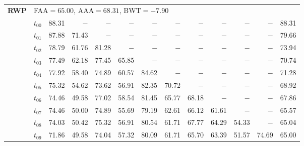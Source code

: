 \begin{table}[ht]
\begin{tabular}{@{}l l r r r r r r r r r r r@{}}
\midrule
\multirow{11}{*}{\textbf{RWP}} & \multicolumn{12}{l}{\quad\small FAA$=65.00$,\; AAA$=68.31$,\; BWT$=-7.90$} \\
 & $t_{00}$ & 88.31 & $-$ & $-$ & $-$ & $-$ & $-$ & $-$ & $-$ & $-$ & $-$ & 88.31 \\
 & $t_{01}$ & 87.88 & 71.43 & $-$ & $-$ & $-$ & $-$ & $-$ & $-$ & $-$ & $-$ & 79.66 \\
 & $t_{02}$ & 78.79 & 61.76 & 81.28 & $-$ & $-$ & $-$ & $-$ & $-$ & $-$ & $-$ & 73.94 \\
 & $t_{03}$ & 77.49 & 62.18 & 77.45 & 65.85 & $-$ & $-$ & $-$ & $-$ & $-$ & $-$ & 70.74 \\
 & $t_{04}$ & 77.92 & 58.40 & 74.89 & 60.57 & 84.62 & $-$ & $-$ & $-$ & $-$ & $-$ & 71.28 \\
 & $t_{05}$ & 75.32 & 54.62 & 73.62 & 56.91 & 82.35 & 70.72 & $-$ & $-$ & $-$ & $-$ & 68.92 \\
 & $t_{06}$ & 74.46 & 49.58 & 77.02 & 58.54 & 81.45 & 65.77 & 68.18 & $-$ & $-$ & $-$ & 67.86 \\
 & $t_{07}$ & 74.46 & 50.00 & 74.89 & 55.69 & 79.19 & 62.61 & 66.12 & 61.61 & $-$ & $-$ & 65.57 \\
 & $t_{08}$ & 74.03 & 50.42 & 75.32 & 56.91 & 80.54 & 61.71 & 67.77 & 64.29 & 54.33 & $-$ & 65.04 \\
 & $t_{09}$ & 71.86 & 49.58 & 74.04 & 57.32 & 80.09 & 61.71 & 65.70 & 63.39 & 51.57 & 74.69 & 65.00 \\
\bottomrule
\end{tabular}
\end{table}

